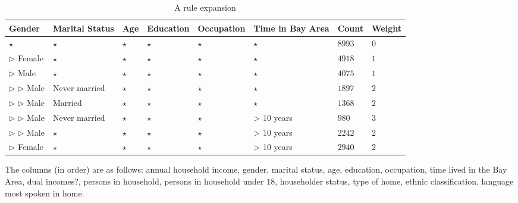 \begin{table} 
\centering 
\scriptsize
\begin{tabular}{| p{1.5cm} | p{1.5cm} | p{1.5cm} | p{1.5cm} | p{1.5cm} | p{1.5cm} | l | l |} 
\hline Gender & Marital Status & Age & Education & Occupation & Time in Bay Area & Count & Weight \\ \hline 
\cline{1-8} $\star$ & $\star$ & $\star$ & $\star$ & $\star$ & $\star$ & $8993$ & $0$ \\
\cline{1-1} \cline{2-2} \cline{3-3} \cline{4-4} \cline{5-5} \cline{6-6} \cline{7-8} $\triangleright$ Female & $\star$ & $\star$ & $\star$ & $\star$ & $\star$ & $4918$ & $1$ \\
\cline{1-1} \cline{2-2} \cline{3-3} \cline{4-4} \cline{5-5} \cline{6-6} \cline{7-8} $\triangleright$ Male & $\star$ & $\star$ & $\star$ & $\star$ & $\star$ & $4075$ & $1$ \\
\cline{2-2} \cline{3-3} \cline{4-4} \cline{5-5} \cline{6-6} \cline{7-8} $\triangleright$ $\triangleright$ Male & Never married & $\star$ & $\star$ & $\star$ & $\star$ & $1897$ & $2$ \\
\cline{2-2} \cline{3-3} \cline{4-4} \cline{5-5} \cline{6-6} \cline{7-8} $\triangleright$ $\triangleright$ Male & Married & $\star$ & $\star$ & $\star$ & $\star$ & $1368$ & $2$ \\
\cline{2-2} \cline{3-3} \cline{4-4} \cline{5-5} \cline{6-6} \cline{7-8} $\triangleright$ $\triangleright$ Male & Never married & $\star$ & $\star$ & $\star$ & > 10 years & $980$ & $3$ \\
\cline{2-2} \cline{3-3} \cline{4-4} \cline{5-5} \cline{6-6} \cline{7-8} $\triangleright$ $\triangleright$ Male & $\star$ & $\star$ & $\star$ & $\star$ & > 10 years & $2242$ & $2$ \\
\cline{1-1} \cline{2-2} \cline{3-3} \cline{4-4} \cline{5-5} \cline{6-6} \cline{7-8} $\triangleright$ Female & $\star$ & $\star$ & $\star$ & $\star$ & > 10 years & $2940$ & $2$ \\
\hline 
\end{tabular} 
\vspace{-10pt}
\caption{A rule expansion \label{table:uiexamplerule}} 
\vspace{-10pt}
\end{table} 
The columns (in order) are as follows:
annual household income, gender, marital status, age, education, occupation, time lived in the Bay Area, dual incomes?, persons in household, persons in household under $18$, householder status, type of home, ethnic classification, language most spoken in home.

